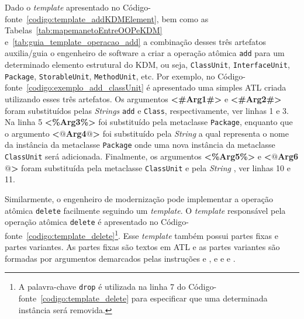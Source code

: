 Dado o \textit{template} apresentado no Código-fonte~\ref{codigo:template_addKDMElement}, bem como as Tabelas~\ref{tab:mapemanetoEntreOOPeKDM} e~\ref{tab:guia_template_operacao_add} a combinação desses três artefatos auxilia/guia o engenheiro de software a criar a operação atômica \texttt{add} para um determinado elemento estrutural do KDM, ou seja, \texttt{ClassUnit}, \texttt{InterfaceUnit}, \texttt{Package}, \texttt{StorableUnit}, \texttt{MethodUnit}, etc. Por exemplo, 
%
%
%
%
%
no Código-fonte~\ref{codigo:exemplo_add_classUnit} é apresentado uma simples ATL criada utilizando esses três artefatos. Os argumentos \textbf{<\#Arg1\#>} e \textbf{<\#Arg2\#>} foram substituídos pelas \textit{Strings} \texttt{add} e \texttt{Class}, respectivamente, ver linhas 1 e 3. Na linha 5 \textbf{<\%Arg3\%>} foi substituído pela metaclasse \texttt{Package}, enquanto que o argumento \textbf{<$@$Arg4$@$>} foi substituído pela \textit{String} \texttt{} a qual representa o nome da instância da metaclasse \texttt{Package} onde uma nova instância da metaclasse \texttt{ClassUnit} será adicionada. Finalmente, os argumentos \textbf{<\%Arg5\%>} e \textbf{<$@$Arg6$@$>} foram substituída pela metaclasse \texttt{ClassUnit} e pela \textit{String} \texttt{}, ver linhas 10 e 11.


Similarmente, o engenheiro de modernização pode implementar a operação atômica \texttt{delete} facilmente seguindo um \textit{template}. O \textit{template} responsável pela operação atômica \texttt{delete} é apresentado no Código-fonte~\ref{codigo:template_delete}\footnote{A palavra-chave \texttt{drop} é utilizada na linha 7 do Código-fonte~\ref{codigo:template_delete} para especificar que uma determinada instância será removida.}. Esse \textit{template} também possui partes fixas e partes variantes. As partes fixas são textos em ATL e as partes variantes são formadas por argumentos demarcados pelas instruções \aspas{\textbf{<\#}} e \aspas{\textbf{\#>}}, \aspas{\textbf{<\%}} e \aspas{\textbf{\%>}} e  e . 


